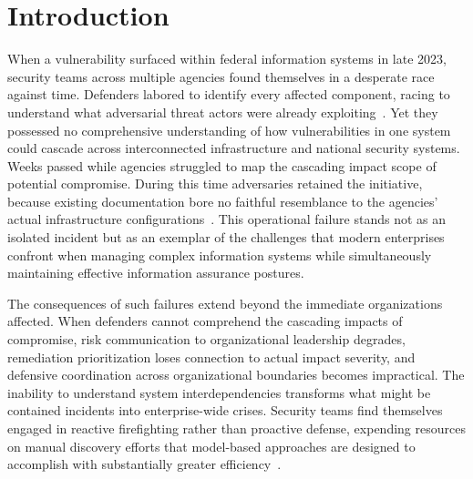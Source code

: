 \chapter{\leavevmode\newline Introduction}\label{chap:Chapter_1}



When a vulnerability surfaced within federal information systems in late 2023, security teams across multiple agencies found themselves in a desperate race against time. Defenders labored to identify every affected component, racing to understand what adversarial threat actors were already exploiting~\parencite{Ivanti_Threat_Impact}. Yet they possessed no comprehensive understanding of how vulnerabilities in one system could cascade across interconnected infrastructure and national security systems. Weeks passed while agencies struggled to map the cascading impact scope of potential compromise. During this time adversaries retained the initiative, because existing documentation bore no faithful resemblance to the agencies' actual infrastructure configurations~\parencite{CISA_Emergency_2023}. This operational failure stands not as an isolated incident but as an exemplar of the challenges that modern enterprises confront when managing complex information systems while simultaneously maintaining effective information assurance postures.

The consequences of such failures extend beyond the immediate organizations affected. When defenders cannot comprehend the cascading impacts of compromise, risk communication to organizational leadership degrades, remediation prioritization loses connection to actual impact severity, and defensive coordination across organizational boundaries becomes impractical. The inability to understand system interdependencies transforms what might be contained incidents into enterprise-wide crises. Security teams find themselves engaged in reactive firefighting rather than proactive defense, expending resources on manual discovery efforts that model-based approaches are designed to accomplish with substantially greater efficiency~\parencite{DoD_DE_Strategy_2018}.

